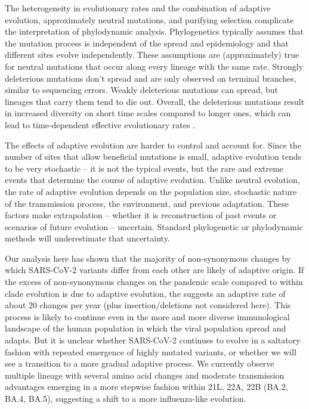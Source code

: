\documentclass[aps,rmp, twocolumn]{revtex4}
\begin{document}
The heterogeneity in evolutionary rates and the combination of adaptive evolution, approximately neutral mutations, and purifying selection complicate the interpretation of phylodynamic analysis.
Phylogenetics typically assumes that the mutation process is independent of the spread and epidemiology and that different sites evolve independently.
These assumptions are (approximately) true for neutral mutations that occur along every lineage with the same rate.
Strongly deleterious mutations don't spread and are only observed on terminal branches, similar to sequencing errors.
Weakly deleterious mutations can spread, but lineages that carry them tend to die out.
Overall, the deleterious mutations result in increased diversity on short time scales compared to longer ones, which can lead to time-dependent effective evolutionary rates \citep{wertheim_purifying_2011}.

The effects of adaptive evolution are harder to control and account for.
Since the number of sites that allow beneficial mutations is small, adaptive evolution tends to be very stochastic -- it is not the typical events, but the rare and extreme events that determine the course of adaptive evolution.
Unlike neutral evolution, the rate of adaptive evolution depends on the population size, stochastic nature of the transmission process, the environment, and previous adaptation.
These factors make extrapolation -- whether it is reconstruction of past events or scenarios of future evolution -- uncertain.
Standard phylogenetic or phylodynamic methods will underestimate that uncertainty.

Our analysis here has shown that the majority of non-synonymous changes by which SARS-CoV-2 variants differ from each other are likely of adaptive origin.
If the excess of non-synonymous changes on the pandemic scale compared to within clade evolution is due to adaptive evolution, the suggests an adaptive rate of about 20 changes per year (plus insertion/deletions not considered here).
This process is likely to continue even in the more and more diverse immunological landscape of the human population in which the viral population spread and adapts.
But it is unclear whether SARS-CoV-2 continues to evolve in a saltatory fashion with repeated emergence of highly mutated variants, or whether we will see a transition to a more gradual adaptive process.
We currently observe multiple lineage with several amino acid changes and moderate transmission advantages emerging in a more stepwise fashion within 21L, 22A, 22B (BA.2, BA.4, BA.5), suggesting a shift to a more influenza-like evolution.
\end{document}

